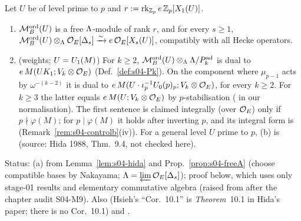 \begin{theorem}\label{thm:s04-control}
Let $U$ be of level prime to $p$ and $r:=\operatorname{rk}_{\mathbb{Z}_p}e\,\mathbb{Z}_p[X_1(U)]$.
\begin{enumerate}[label=(\alph*)]
\item $\mathcal{M}^{\mathrm{ord}}_B(U)$ is a free $\Lambda$-module of rank $r$, and for every $s\ge1$,
  $\mathcal{M}^{\mathrm{ord}}_B(U)\otimes_\Lambda\mathcal{O}_E[\Delta_s]\xrightarrow{\sim}e\,\mathcal{O}_E[X_s(U)]$, compatibly with all Hecke operators.
\item (weights; $U=U_1(M)$) For $k\ge2$, $\mathcal{M}^{\mathrm{ord}}_B(U)\otimes_\Lambda\Lambda/P^{\rm ad}_k$ is dual to $e\,M(UK_{1};V_k\otimes\mathcal{O}_E)$ (Def.~\ref{def:s04-Pk}).
  On the component where $\mu_{p-1}$ acts by $\omega^{-(k-2)}$ it is dual to $e\,M(U\cdot\iota_p^{-1}U_0(p)_p;V_k\otimes\mathcal{O}_E)$, for every $k\ge2$.
  For $k\ge3$ the latter equals $e\,M(U;V_k\otimes\mathcal{O}_E)$ by $p$-stabilisation (\stexp{} in our normalisation).
  The first sentence is claimed integrally (over $\mathcal{O}_E$) only if $p\nmid\varphi(M)$; for $p\mid\varphi(M)$ it holds after inverting $p$,
  and its integral form is \stsketch{} (Remark~\ref{rem:s04-controlb}(iv)). For a general level $U$ prime to $p$, (b) is \stexp{}
  (source: Hida 1988, Thm.~9.4, not checked here).
\end{enumerate}
Status: (a) \stproved{} from Lemma~\ref{lem:s04-hida} and Prop.~\ref{prop:s04-freeA} (choose compatible bases by Nakayama;
$\Lambda=\varprojlim\mathcal{O}_E[\Delta_s]$); proof below, which uses only stage-01 results and elementary commutative algebra (raised from
\stpmc{} after the chapter audit S04-M9). Also \stcited{}  (Hsieh's ``Cor.~10.1'' is
\emph{Theorem}~10.1 in Hida's paper; there is no Cor.~10.1) and
.

\end{theorem}
